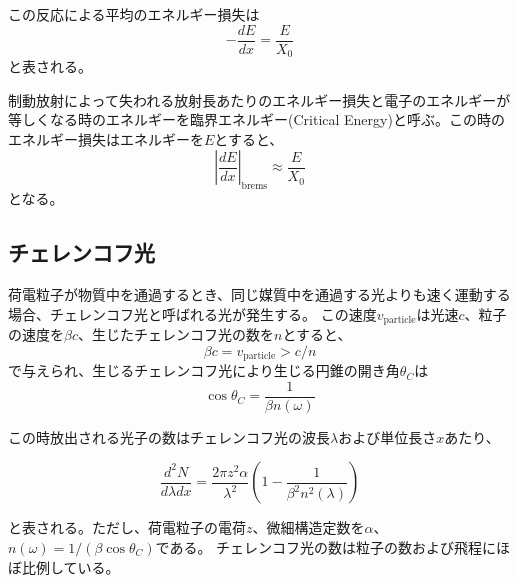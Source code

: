 この反応による平均のエネルギー損失は
\begin{equation}
-\frac{dE}{dx} = \frac{E}{X_0}
\end{equation}
と表される。

制動放射によって失われる放射長あたりのエネルギー損失と電子のエネルギーが等しくなる時のエネルギーを臨界エネルギー(Critical Energy)と呼ぶ。この時のエネルギー損失はエネルギーを$E$とすると、
\begin{equation}
\left|\frac{dE}{dx}\right|_{\mathrm{brems}}\approx  \frac{E}{X_0}
\end{equation}
となる。

\subsection{チェレンコフ光}
荷電粒子が物質中を通過するとき、同じ媒質中を通過する光よりも速く運動する場合、チェレンコフ光と呼ばれる光が発生する。
この速度$v_{\mathrm{particle}}$は光速$c$、粒子の速度を$\beta c$、生じたチェレンコフ光の数を$n$とすると、
\begin{equation}
\beta c = v_{\mathrm{particle}} > c/n
\end{equation}
で与えられ、生じるチェレンコフ光により生じる円錐の開き角$\theta_C$は
\begin{equation}
\cos\theta_C=\frac{1}{\beta n(\omega)}
\end{equation}


この時放出される光子の数はチェレンコフ光の波長$\lambda$および単位長さ$x$あたり、

\begin{equation}
\frac{d^2 N}{d\lambda dx}=\frac{2\pi z^2\alpha}{\lambda^2}\left(1-\frac{1}{\beta^2n^2(\lambda)}\right)
\end{equation}

と表される。ただし、荷電粒子の電荷$z$、微細構造定数を$\alpha$、$n(\omega)=1/(\beta \cos\theta_C)$である。
チェレンコフ光の数は粒子の数および飛程にほぼ比例している。

